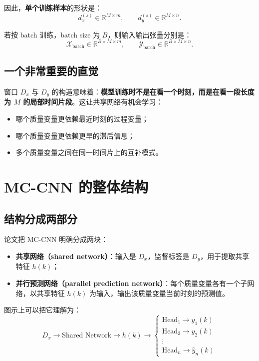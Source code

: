 \documentclass[UTF8]{ctexart}
\begin{document}
因此，\textbf{单个训练样本}的形状是：
\begin{equation}
    d_x^{(s)} \in \mathbb{R}^{M \times m}, \qquad
    d_y^{(s)} \in \mathbb{R}^{M \times n}.
\end{equation}

若按 batch 训练，batch size 为 $B$，则输入输出张量分别是：
\begin{equation}
    \mathcal{X}_{\text{batch}} \in \mathbb{R}^{B \times M \times m}, \qquad
    \mathcal{Y}_{\text{batch}} \in \mathbb{R}^{B \times M \times n}.
\end{equation}

\subsection{一个非常重要的直觉}

窗口 $D_x$ 与 $D_y$ 的构造意味着：\textbf{模型训练时不是在看一个时刻，而是在看一段长度为 $M$ 的局部时间片段}。这让共享网络有机会学习：
\begin{itemize}
    \item 哪个质量变量更依赖最近时刻的过程变量；
    \item 哪个质量变量更依赖更早的滞后信息；
    \item 多个质量变量之间在同一时间片上的互补模式。
\end{itemize}

\section{MC-CNN 的整体结构}

\subsection{结构分成两部分}

论文把 MC-CNN 明确分成两块：
\begin{itemize}
    \item \textbf{共享网络（shared network）}：输入是 $D_x$，监督标签是 $D_y$，用于提取共享特征 $h(k)$；
    \item \textbf{并行预测网络（parallel prediction network）}：每个质量变量各有一个子网络，以共享特征 $h(k)$ 为输入，输出该质量变量当前时刻的预测值。
\end{itemize}

图示上可以把它理解为：
\begin{equation}
    D_x \longrightarrow \text{Shared Network} \longrightarrow h(k)
    \longrightarrow
    \begin{cases}
        \text{Head}_1 \to \hat{y}_1(k) \\
        \text{Head}_2 \to \hat{y}_2(k) \\
        \vdots \\
        \text{Head}_n \to \hat{y}_n(k)
    \end{cases}
\end{equation}
\end{document}

